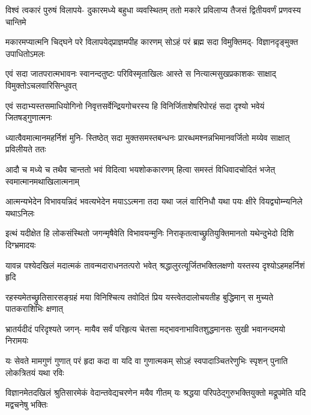 \fourlineindentedshloka
{विश्वं त्वकारं पुरुषं विलापये-}
{दुकारमध्ये बहुधा व्यवस्थितम्}
{ततो मकारे प्रविलाप्य तैजसं}
{द्वितीयवर्णं प्रणवस्य चान्तिमे} %

\fourlineindentedshloka
{मकारमप्यात्मनि चिद्घने परे}
{विलापयेद्प्राज्ञमपीह कारणम्}
{सोऽहं परं ब्रह्म सदा विमुक्तिमद्-}
{विज्ञानदृङ्मुक्त उपाधितोऽमलः} %

\fourlineindentedshloka
{एवं सदा जातपरात्मभावनः}
{स्वानन्दतुष्टः परिविस्मृताखिलः}
{आस्ते स नित्यात्मसुखप्रकाशकः}
{साक्षाद् विमुक्तोऽचलवारिसिन्धुवत्} %

\fourlineindentedshloka
{एवं सदाभ्यस्तसमाधियोगिनो}
{निवृत्तसर्वेन्द्रियगोचरस्य हि}
{विनिर्जिताशेषरिपोरहं सदा}
{दृश्यो भवेयं जितषड्गुणात्मनः} %

\fourlineindentedshloka
{ध्यात्वैवमात्मानमहर्निशं मुनि-}
{स्तिष्ठेत् सदा मुक्तसमस्तबन्धनः}
{प्रारब्धमश्नन्नभिमानवर्जितो}
{मय्येव साक्षात् प्रविलीयते ततः} %

\fourlineindentedshloka
{आदौ च मध्ये च तथैव चान्ततो}
{भवं विदित्वा भयशोककारणम्}
{हित्वा समस्तं विधिवादचोदितं}
{भजेत् स्वमात्मानमथाखिलात्मनाम्} %

\fourlineindentedshloka
{आत्मन्यभेदेन विभावयन्निदं}
{भवत्यभेदेन मयाऽऽत्मना तदा}
{यथा जलं वारिनिधौ यथा पयः}
{क्षीरे वियद्व्योम्न्यनिले यथाऽनिलः} %

\fourlineindentedshloka
{इत्थं यदीक्षेत हि लोकसंस्थितो}
{जगन्मृषैवेति विभावयन्मुनिः}
{निराकृतत्वाच्छ्रुतियुक्तिमानतो}
{यथेन्दुभेदो दिशि दिग्भ्रमादयः} %

\fourlineindentedshloka
{यावन्न पश्येदखिलं मदात्मकं}
{तावन्मदाराधनतत्परो भवेत्}
{श्रद्धालुरत्यूर्जितभक्तिलक्षणो}
{यस्तस्य दृश्योऽहमहर्निशं हृदि} %

\fourlineindentedshloka
{रहस्यमेतच्छ्रुतिसारसङ्ग्रहं}
{मया विनिश्चित्य तवोदितं प्रिय}
{यस्त्वेतदालोचयतीह बुद्धिमान्}
{स मुच्यते पातकराशिभिः क्षणात्} %

\fourlineindentedshloka
{भ्रातर्यदीदं परिदृश्यते जगन्-}
{मायैव सर्वं परिहृत्य चेतसा}
{मद्भावनाभावितशुद्धमानसः}
{सुखी भवानन्दमयो निरामयः} %

\fourlineindentedshloka
{यः सेवते मामगुणं गुणात् परं}
{हृदा कदा वा यदि वा गुणात्मकम्}
{सोऽहं स्वपादाञ्चितरेणुभिः स्पृशन्}
{पुनाति लोकत्रितयं यथा रविः} %

\fourlineindentedshloka
{विज्ञानमेतदखिलं श्रुतिसारमेकं}
{वेदान्तवेद्यचरणेन मयैव गीतम्}
{यः श्रद्धया परिपठेद्गुरुभक्तियुक्तो}
{मद्रूपमेति यदि मद्वचनेषु भक्तिः} %




